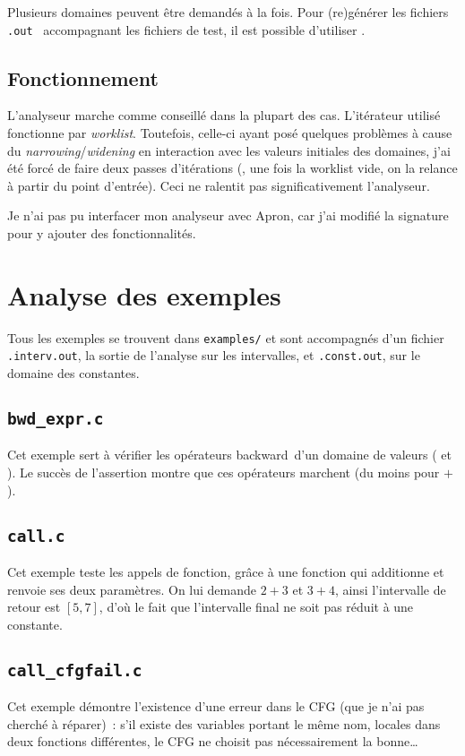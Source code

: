 \documentclass[11pt,a4paper]{article}
\begin{document}
Plusieurs domaines peuvent être demandés à la fois. Pour
(re)générer les fichiers \og{}\texttt{.out}~\fg{} %
accompagnant les fichiers de test, il est possible d'utiliser
.

\subsection{Fonctionnement}

L'analyseur marche comme conseillé dans la plupart des cas. L'itérateur utilisé
fonctionne par \textit{worklist}. Toutefois, celle-ci ayant posé quelques
problèmes à cause du \textit{narrowing}/\textit{widening} en interaction
avec les valeurs initiales des domaines, j'ai été forcé de faire deux passes
d'itérations (\ie, une fois la worklist vide, on la relance à partir du point
d'entrée). Ceci ne ralentit pas significativement l'analyseur.

Je n'ai pas pu interfacer mon analyseur avec Apron, car j'ai modifié la
signature  pour y ajouter des fonctionnalités.

\section{Analyse des exemples}
Tous les exemples se trouvent dans \texttt{examples/} et sont accompagnés
d'un fichier \texttt{.interv.out}, la sortie de l'analyse sur les intervalles,
et \texttt{.const.out}, sur le domaine des constantes.

\subsection{\texttt{bwd\_expr.c}}
Cet exemple sert à vérifier les opérateurs \og{}backward~\fg{}d'un domaine de
valeurs ( et ). Le succès de
l'assertion montre que ces opérateurs marchent (du moins pour $+$).

\subsection{\texttt{call.c}}
Cet exemple teste les appels de fonction, grâce à une fonction 
qui additionne et renvoie ses deux paramètres. On lui demande $2+3$ et $3+4$,
ainsi l'intervalle de retour est $[5, 7]$, d'où le fait que l'intervalle
final ne soit pas réduit à une constante.

\subsection{\texttt{call\_cfgfail.c}}
Cet exemple démontre l'existence d'une erreur dans le CFG (que je n'ai pas
cherché à réparer)~: s'il existe des variables portant le même nom, locales
dans deux fonctions différentes, le CFG ne choisit pas nécessairement la
bonne\ldots
\end{document}

